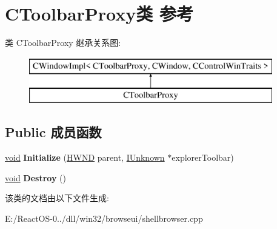 \hypertarget{class_c_toolbar_proxy}{}\section{C\+Toolbar\+Proxy类 参考}
\label{class_c_toolbar_proxy}
类 C\+Toolbar\+Proxy 继承关系图\+:\begin{figure}[H]
\begin{center}
\leavevmode
\includegraphics[height=2.000000cm]{class_c_toolbar_proxy}
\end{center}
\end{figure}
\subsection*{Public 成员函数}
\begin{DoxyCompactItemize}
\item 
\mbox{\label{class_c_toolbar_proxy_ae85db8ff1b517d8379d7903873b2fc9c}} 
\hyperlink{interfacevoid}{void} {\bfseries Initialize} (\hyperlink{interfacevoid}{H\+W\+ND} parent, \hyperlink{interface_i_unknown}{I\+Unknown} $\ast$explorer\+Toolbar)
\item 
\mbox{\label{class_c_toolbar_proxy_a37e62e85fa2dca7711e8fcd8f16aadb8}} 
\hyperlink{interfacevoid}{void} {\bfseries Destroy} ()
\end{DoxyCompactItemize}


该类的文档由以下文件生成\+:\begin{DoxyCompactItemize}
\item 
E\+:/\+React\+O\+S-\/0../dll/win32/browseui/shellbrowser.\+cpp\end{DoxyCompactItemize}
